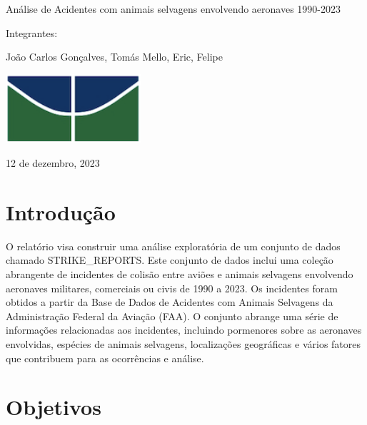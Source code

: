 \documentclass[
]{article}
\author{}
\date{\vspace{-2.5em}}
\begin{document}
\begin{center}
    \Huge Análise de Acidentes com animais selvagens envolvendo aeronaves 1990-2023
\end{center}

\vspace{1.5cm}

\begin{center}
    \Large Integrantes:
    
    João Carlos Gonçalves, Tomás Mello, Eric, Felipe
\end{center}

\vspace{1.5cm}

\begin{center}
    \includegraphics[width=5cm]{src/images/logo_unb.png}
\end{center}

\begin{center}
    \Large 12 de dezembro, 2023
\end{center}

\newpage

\section{\Huge Introdução}
\label{sec:Introducao}

\vspace{1.5cm}

\Large    O relatório visa construir uma análise exploratória de um
conjunto de dados chamado STRIKE\_REPORTS. Este conjunto de dados inclui
uma coleção abrangente de incidentes de colisão entre aviões e animais
selvagens envolvendo aeronaves militares, comerciais ou civis de 1990 a
2023. Os incidentes foram obtidos a partir da Base de Dados de Acidentes
com Animais Selvagens da Administração Federal da Aviação (FAA). O
conjunto abrange uma série de informações relacionadas aos incidentes,
incluindo pormenores sobre as aeronaves envolvidas, espécies de animais
selvagens, localizações geográficas e vários fatores que contribuem para
as ocorrências e análise.

\vspace{1.5cm}

\section{\Huge Objetivos}
\label{sec:Objetivos}
\end{document}

